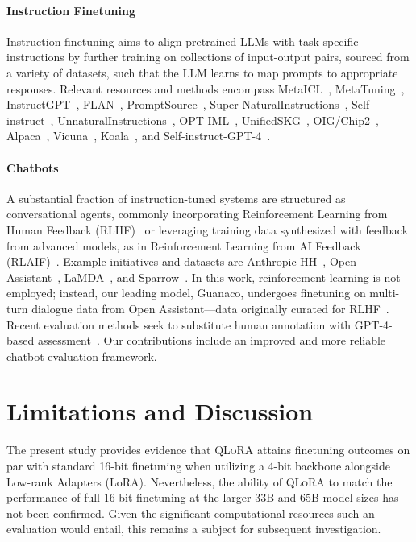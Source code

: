 \paragraph{Instruction Finetuning} Instruction finetuning aims to align pretrained LLMs with task-specific instructions by further training on collections of input-output pairs, sourced from a variety of datasets, such that the LLM learns to map prompts to appropriate responses. Relevant resources and methods encompass MetaICL~\citep{min2021metaicl}, MetaTuning~\citep{zhong2021adapting}, InstructGPT~\citep{ouyang2022training}, FLAN~\citep{wei2021finetuned,chung2022scaling}, PromptSource~\citep{bach2022promptsource}, Super-NaturalInstructions~\citep{wang2022super,sanh2021multitask}, Self-instruct~\citep{wang2022self}, UnnaturalInstructions~\citep{honovich2022unnatural}, OPT-IML~\citep{iyer2022opt}, UnifiedSKG~\citep{xie2022unifiedskg}, OIG/Chip2~\citep{laion2023}, Alpaca~\citep{alpaca}, Vicuna~\citep{vicuna2023}, Koala~\citep{koala_blogpost_2023}, and Self-instruct-GPT-4~\citep{peng2023instruction}.

\paragraph{Chatbots} A substantial fraction of instruction-tuned systems are structured as conversational agents, commonly incorporating Reinforcement Learning from Human Feedback (RLHF)~\citep{christiano2017deep} or leveraging training data synthesized with feedback from advanced models, as in Reinforcement Learning from AI Feedback (RLAIF)~\citep{bai2022constitutional}. Example initiatives and datasets are Anthropic-HH~\citep{askell2021general,bai2022training}, Open Assistant~\citep{kopf2023openassistant}, LaMDA~\citep{thoppilan2022lamda}, and Sparrow~\citep{glaese2022improving}. In this work, reinforcement learning is not employed; instead, our leading model, Guanaco, undergoes finetuning on multi-turn dialogue data from Open Assistant—data originally curated for RLHF~\citep{kopf2023openassistant}. Recent evaluation methods seek to substitute human annotation with GPT-4-based assessment~\citep{vicuna2023,peng2023instruction}. Our contributions include an improved and more reliable chatbot evaluation framework.

\section{Limitations and Discussion}

The present study provides evidence that \textsc{QLoRA} attains finetuning outcomes on par with standard 16-bit finetuning when utilizing a 4-bit backbone alongside Low-rank Adapters (LoRA). Nevertheless, the ability of \textsc{QLoRA} to match the performance of full 16-bit finetuning at the larger 33B and 65B model sizes has not been confirmed. Given the significant computational resources such an evaluation would entail, this remains a subject for subsequent investigation.

